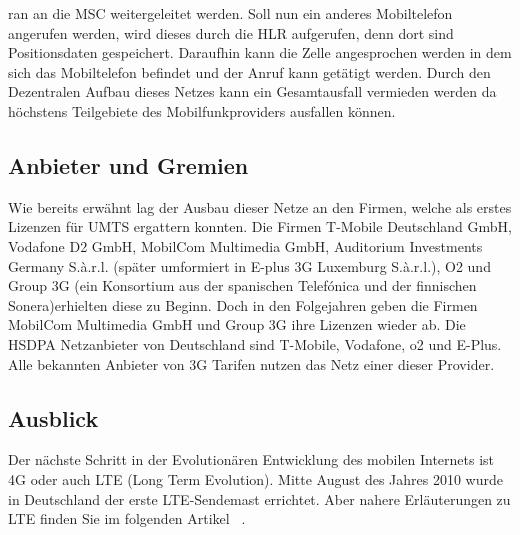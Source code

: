 \begin{multicols}{3}


ran an die MSC weitergeleitet werden. Soll nun ein anderes Mobiltelefon angerufen werden, wird dieses durch die HLR aufgerufen, denn dort sind Positionsdaten gespeichert. Daraufhin kann die Zelle angesprochen werden in dem sich das Mobiltelefon befindet und der Anruf kann getätigt werden. 
Durch den Dezentralen Aufbau dieses Netzes kann ein Gesamtausfall vermieden werden da höchstens Teilgebiete des Mobilfunkproviders ausfallen können. ~\cite{3G.1}

\subsection*{Anbieter und Gremien}
Wie bereits erwähnt lag der Ausbau dieser Netze an den Firmen, welche als erstes Lizenzen für UMTS ergattern konnten. Die Firmen T-Mobile Deutschland GmbH, Vodafone D2 GmbH, MobilCom Multimedia GmbH, Auditorium Investments Germany S.à.r.l. (später umformiert in E-plus 3G Luxemburg S.à.r.l.), O2 und Group 3G (ein Konsortium aus der spanischen Telefónica und der finnischen Sonera)erhielten diese zu Beginn.  Doch in den Folgejahren geben die Firmen MobilCom Multimedia GmbH und Group 3G ihre Lizenzen wieder ab.
Die HSDPA Netzanbieter von Deutschland sind T-Mobile, Vodafone, o2 und E-Plus. Alle bekannten Anbieter von 3G Tarifen nutzen das Netz einer dieser Provider. 
~\cite{3G.1, 3G.2}

\subsection*{Ausblick}
Der nächste Schritt in der Evolutionären Entwicklung des mobilen Internets ist 4G oder auch LTE (Long Term Evolution). Mitte August des Jahres 2010 wurde in Deutschland der erste LTE-Sendemast errichtet. Aber nahere Erläuterungen zu LTE finden Sie im folgenden Artikel ~\cite{3G.2}.


\printbibliography[segment=13,heading=subbibliography]
\end{multicols}



\newpage